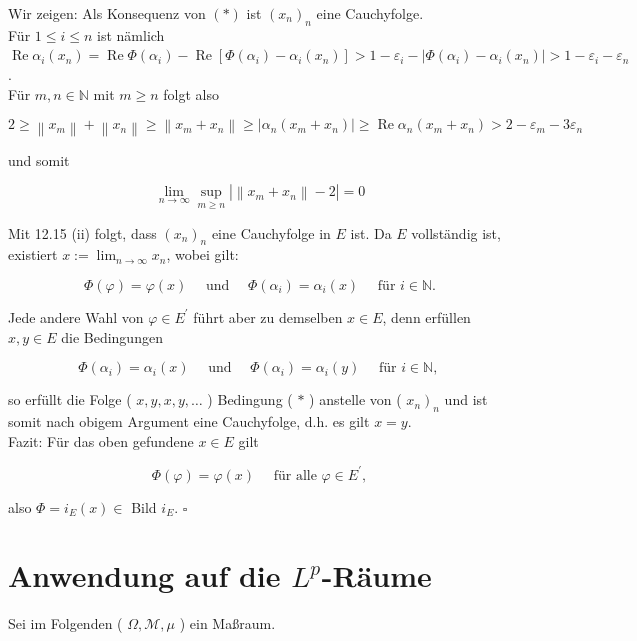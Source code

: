 \documentclass[10pt, letterpaper]{article}
\begin{document}
Wir zeigen: Als Konsequenz von $(*)$ ist $\left(x_{n}\right)_{n}$ eine Cauchyfolge.\\
Für $1 \leq i \leq n$ ist nämlich\\
$\operatorname{Re} \alpha_{i}\left(x_{n}\right)=\operatorname{Re} \Phi\left(\alpha_{i}\right)-\operatorname{Re}\left[\Phi\left(\alpha_{i}\right)-\alpha_{i}\left(x_{n}\right)\right]>1-\varepsilon_{i}-\left|\Phi\left(\alpha_{i}\right)-\alpha_{i}\left(x_{n}\right)\right|>1-\varepsilon_{i}-\varepsilon_{n}$.\\
Für $m, n \in \mathbb{N}$ mit $m \geq n$ folgt also

$$
2 \geq\left\|x_{m}\right\|+\left\|x_{n}\right\| \geq\left\|x_{m}+x_{n}\right\| \geq\left|\alpha_{n}\left(x_{m}+x_{n}\right)\right| \geq \operatorname{Re} \alpha_{n}\left(x_{m}+x_{n}\right)>2-\varepsilon_{m}-3 \varepsilon_{n}
$$

und somit

$$
\lim _{n \rightarrow \infty} \sup _{m \geq n}\left|\left\|x_{m}+x_{n}\right\|-2\right|=0
$$

Mit 12.15 (ii) folgt, dass $\left(x_{n}\right)_{n}$ eine Cauchyfolge in $E$ ist. Da $E$ vollständig ist, existiert $x:=\lim _{n \rightarrow \infty} x_{n}$, wobei gilt:

$$
\Phi(\varphi)=\varphi(x) \quad \text { und } \quad \Phi\left(\alpha_{i}\right)=\alpha_{i}(x) \quad \text { für } i \in \mathbb{N} .
$$

Jede andere Wahl von $\varphi \in E^{\prime}$ führt aber zu demselben $x \in E$, denn erfüllen $x, y \in E$ die Bedingungen

$$
\Phi\left(\alpha_{i}\right)=\alpha_{i}(x) \quad \text { und } \quad \Phi\left(\alpha_{i}\right)=\alpha_{i}(y) \quad \text { für } i \in \mathbb{N} \text {, }
$$

so erfüllt die Folge ( $x, y, x, y, \ldots$ ) Bedingung ( $*$ ) anstelle von ( $\left.x_{n}\right)_{n}$ und ist somit nach obigem Argument eine Cauchyfolge, d.h. es gilt $x=y$.\\
Fazit: Für das oben gefundene $x \in E$ gilt

$$
\Phi(\varphi)=\varphi(x) \quad \text { für alle } \varphi \in E^{\prime},
$$

also $\Phi=i_{E}(x) \in$ Bild $i_{E}$. \(\square\)

\section*{Anwendung auf die $L^{p}$-Räume}
Sei im Folgenden ( $\Omega, \mathcal{M}, \mu$ ) ein Maßraum.
\end{document}
